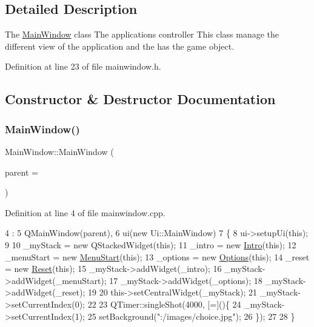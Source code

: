\subsection{Detailed Description}
The \hyperlink{class_main_window}{Main\+Window} class The application\textquotesingle{}s controller This class manage the different view of the application and the has the game object. 

Definition at line 23 of file mainwindow.\+h.



\subsection{Constructor \& Destructor Documentation}
\hypertarget{class_main_window_a8b244be8b7b7db1b08de2a2acb9409db}{}\label{class_main_window_a8b244be8b7b7db1b08de2a2acb9409db} 
\subsubsection{\texorpdfstring{Main\+Window()}{MainWindow()}}
{\footnotesize\ttfamily Main\+Window\+::\+Main\+Window (\begin{DoxyParamCaption}\item[{Q\+Widget $\ast$}]{parent = {} }\end{DoxyParamCaption})\hspace{0.3cm}{\ttfamily [explicit]}}



Definition at line 4 of file mainwindow.\+cpp.


\begin{DoxyCode}
4                                       :
5     QMainWindow(parent),
6     ui(\textcolor{keyword}{new} Ui::MainWindow)
7 \{
8     ui->setupUi(\textcolor{keyword}{this});
9 
10     \_myStack = \textcolor{keyword}{new} QStackedWidget(\textcolor{keyword}{this});
11     \_intro = \textcolor{keyword}{new} \hyperlink{class_intro}{Intro}(\textcolor{keyword}{this});
12     \_menuStart = \textcolor{keyword}{new} \hyperlink{class_menu_start}{MenuStart}(\textcolor{keyword}{this});
13     \_options = \textcolor{keyword}{new} \hyperlink{class_options}{Options}(\textcolor{keyword}{this});
14     \_reset = \textcolor{keyword}{new} \hyperlink{class_reset}{Reset}(\textcolor{keyword}{this});
15     \_myStack->addWidget(\_intro);
16     \_myStack->addWidget(\_menuStart);
17     \_myStack->addWidget(\_options);
18     \_myStack->addWidget(\_reset);
19 
20     this->setCentralWidget(\_myStack);
21     \_myStack->setCurrentIndex(0);
22 
23     QTimer::singleShot(4000, [=]()\{
24         \_myStack->setCurrentIndex(1);
25         setBackground(\textcolor{stringliteral}{":/images/choice.jpg"});
26     \});
27 
28 \}
\end{DoxyCode}
\hypertarget{class_main_window_ae98d00a93bc118200eeef9f9bba1dba7}{}\label{class_main_window_ae98d00a93bc118200eeef9f9bba1dba7} 
